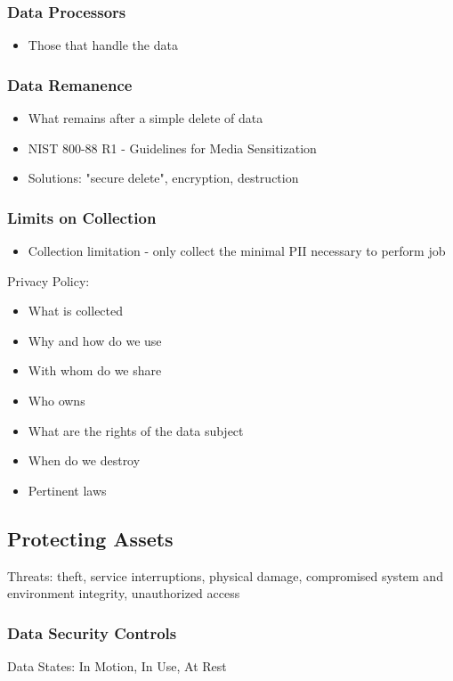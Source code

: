 \documentclass[11pt]{article}
\begin{document}
\subsubsection{Data Processors}
\label{sec:org1c1be3e}
\begin{itemize}
\item Those that handle the data
\end{itemize}
\subsubsection{Data Remanence}
\label{sec:org5b062ef}
\begin{itemize}
\item What remains after a simple delete of data
\item NIST 800-88 R1 - Guidelines for Media Sensitization
\item Solutions: "secure delete", encryption, destruction
\end{itemize}
\subsubsection{Limits on Collection}
\label{sec:org50d0bad}
\begin{itemize}
\item Collection limitation - only collect the minimal PII necessary to perform job
\end{itemize}

Privacy Policy:
\begin{itemize}
\item What is collected
\item Why and how do we use
\item With whom do we share
\item Who owns
\item What are the rights of the data subject
\item When do we destroy
\item Pertinent laws
\end{itemize}
\subsection{Protecting Assets}
\label{sec:org6783434}
Threats: theft, service interruptions, physical damage, compromised system and environment integrity, unauthorized access
\subsubsection{Data Security Controls}
\label{sec:org99007d8}
Data States: In Motion, In Use, At Rest
\end{document}

